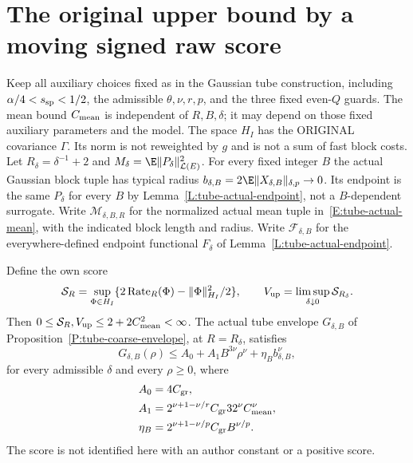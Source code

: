 \section{The original upper bound by a moving signed raw score}
\label{S:original-signed-score-upper}

Keep all auxiliary choices fixed as in the Gaussian tube construction,
including $\alpha/4<s_{\rm sp}<1/2$, the admissible $\theta,\nu,r,p$,
and the three fixed even-$Q$ guards.
The mean bound $C_{\rm mean}$ is independent of $R,B,\delta$;
it may depend on those fixed auxiliary parameters and the model.
The space $H_I$ has the ORIGINAL covariance $\Gamma$.
Its norm is not reweighted by $g$ and is not a sum of fast block costs.
Let $R_\delta=\delta^{-1}+2$ and
$M_\delta=\E\|P_\delta\|_{\mathcal L(E)}^2$.
For every fixed integer $B$ the actual Gaussian block tuple has typical
radius $b_{\delta,B}=2\E\|X_{\delta,B}\|_{\delta,p}\to0$.
Its endpoint is the same $P_\delta$ for every $B$ by
Lemma~\ref{L:tube-actual-endpoint}, not a $B$-dependent surrogate.
Write $\mathcal M_{\delta,B,R}$ for the normalized actual mean tuple
in~\eqref{E:tube-actual-mean}, with the indicated block length and radius.
Write $\mathcal F_{\delta,B}$ for the everywhere-defined endpoint
functional $F_\delta$ of Lemma~\ref{L:tube-actual-endpoint}.

\begin{lemma}
  \label{L:signed-score-envelope}
  Define the own score
  \begin{equation}\label{E:signed-raw-score}
    \mathcal S_R=\sup_{\Phi\in H_I}
    \{2\operatorname{Rate}_R(\Phi)-\|\Phi\|_{H_I}^2/2\},
    \qquad V_{\rm up}=\limsup_{\delta\downarrow0}\mathcal S_{R_\delta}.
  \end{equation}
  Then $0\le\mathcal S_R,V_{\rm up}\le2+2C_{\rm mean}^2<\infty$.
  The actual tube envelope $G_{\delta,B}$ of
  Proposition~\ref{P:tube-coarse-envelope}, at $R=R_\delta$, satisfies
  \begin{equation}\label{E:signed-polynomial-envelope}
    G_{\delta,B}(\rho)\le A_0+A_1B^{3\nu}\rho^\nu
    +\eta_B b_{\delta,B}^\nu ,
  \end{equation}
  for every admissible $\delta$ and every $\rho\ge0$, where
  \[
    \begin{aligned}
      A_0&=4C_{\rm gr},\\
      A_1&=2^{\nu+1-\nu/r}C_{\rm gr}32^\nu C_{\rm mean}^\nu,\\
      \eta_B&=2^{\nu+1-\nu/p}C_{\rm gr}B^{\nu/p}.
    \end{aligned}
  \]
  The score is not identified here with an author constant or a positive score.
\end{lemma}

